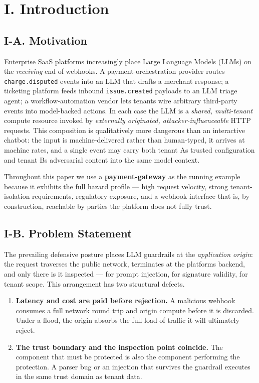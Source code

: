 \section{I. Introduction}\label{i-introduction}

\subsection{I-A. Motivation}\label{i-a-motivation}

Enterprise SaaS platforms increasingly place Large Language Models
(LLMs) on the \emph{receiving} end of webhooks. A payment-orchestration
provider routes \passthrough{\lstinline!charge.disputed!} events into an
LLM that drafts a merchant response; a ticketing platform feeds inbound
\passthrough{\lstinline!issue.created!} payloads to an LLM triage agent;
a workflow-automation vendor lets tenants wire arbitrary third-party
events into model-backed actions. In each case the LLM is a
\emph{shared, multi-tenant} compute resource invoked by \emph{externally
originated, attacker-influenceable} HTTP requests. This composition is
qualitatively more dangerous than an interactive chatbot: the input is
machine-delivered rather than human-typed, it arrives at machine rates,
and a single event may carry both tenant A\textquotesingle s trusted
configuration and tenant B\textquotesingle s adversarial content into
the same model context.

Throughout this paper we use a \textbf{payment-gateway} as the running
example because it exhibits the full hazard profile --- high request
velocity, strong tenant-isolation requirements, regulatory exposure, and
a webhook interface that is, by construction, reachable by parties the
platform does not fully trust.

\subsection{I-B. Problem Statement}\label{i-b-problem-statement}

The prevailing defensive posture places LLM guardrails at the
\emph{application origin}: the request traverses the public network,
terminates at the platform\textquotesingle s backend, and only there is
it inspected --- for prompt injection, for signature validity, for
tenant scope. This arrangement has two structural defects.

\begin{enumerate}
\def\labelenumi{\arabic{enumi}.}
\tightlist
\item
  \textbf{Latency and cost are paid before rejection.} A malicious
  webhook consumes a full network round trip and origin compute before
  it is discarded. Under a flood, the origin absorbs the full load of
  traffic it will ultimately reject.
\item
  \textbf{The trust boundary and the inspection point coincide.} The
  component that must be protected is also the component performing the
  protection. A parser bug or an injection that survives the guardrail
  executes in the same trust domain as tenant data.
\end{enumerate}

